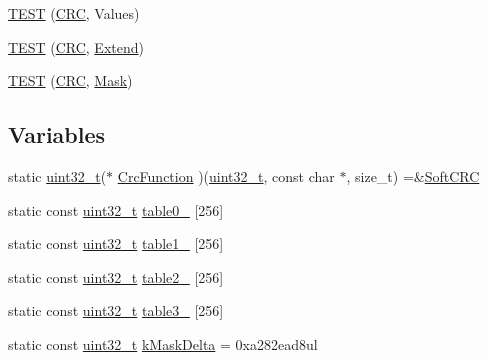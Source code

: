 \begin{DoxyCompactItemize}
\item 
\hyperlink{namespaceleveldb_1_1crc32c_aeca842cf29e5136e1594dd5e0a714d7f}{T\+E\+S\+T} (\hyperlink{classleveldb_1_1crc32c_1_1_c_r_c}{C\+R\+C}, Values)
\item 
\hyperlink{namespaceleveldb_1_1crc32c_aec2f6fd8802f5c6473281a2400301fa4}{T\+E\+S\+T} (\hyperlink{classleveldb_1_1crc32c_1_1_c_r_c}{C\+R\+C}, \hyperlink{namespaceleveldb_1_1crc32c_ac42fd0618afe635356d722fd29f5ff10}{Extend})
\item 
\hyperlink{namespaceleveldb_1_1crc32c_aeae3dd6a190a86fb295e1232715e2b23}{T\+E\+S\+T} (\hyperlink{classleveldb_1_1crc32c_1_1_c_r_c}{C\+R\+C}, \hyperlink{namespaceleveldb_1_1crc32c_a3790e1e939714a29609e46383aafd6cf}{Mask})
\end{DoxyCompactItemize}
\subsection*{Variables}
\begin{DoxyCompactItemize}
\item 
static \hyperlink{stdint_8h_a435d1572bf3f880d55459d9805097f62}{uint32\+\_\+t}($\ast$ \hyperlink{namespaceleveldb_1_1crc32c_a6d47e5e948707883faef34642ea854df}{Crc\+Function} )(\hyperlink{stdint_8h_a435d1572bf3f880d55459d9805097f62}{uint32\+\_\+t}, const char $\ast$, size\+\_\+t) =\&\hyperlink{namespaceleveldb_1_1crc32c_af488f9f0d6bc518b954644a250ae2a6d}{Soft\+C\+R\+C}
\item 
static const \hyperlink{stdint_8h_a435d1572bf3f880d55459d9805097f62}{uint32\+\_\+t} \hyperlink{namespaceleveldb_1_1crc32c_ade0c8f1e2098799a8924d05b30411817}{table0\+\_\+} \mbox{[}256\mbox{]}
\item 
static const \hyperlink{stdint_8h_a435d1572bf3f880d55459d9805097f62}{uint32\+\_\+t} \hyperlink{namespaceleveldb_1_1crc32c_af456bfb794e6108a828e5d3a2a58700c}{table1\+\_\+} \mbox{[}256\mbox{]}
\item 
static const \hyperlink{stdint_8h_a435d1572bf3f880d55459d9805097f62}{uint32\+\_\+t} \hyperlink{namespaceleveldb_1_1crc32c_af5be8e058bd89cbd43972aa986910599}{table2\+\_\+} \mbox{[}256\mbox{]}
\item 
static const \hyperlink{stdint_8h_a435d1572bf3f880d55459d9805097f62}{uint32\+\_\+t} \hyperlink{namespaceleveldb_1_1crc32c_a212c50cb25082d3d84471483d26ac2f5}{table3\+\_\+} \mbox{[}256\mbox{]}
\item 
static const \hyperlink{stdint_8h_a435d1572bf3f880d55459d9805097f62}{uint32\+\_\+t} \hyperlink{namespaceleveldb_1_1crc32c_ae1bd49dbeac3e469a5a4347989f2e8b3}{k\+Mask\+Delta} = 0xa282ead8ul
\end{DoxyCompactItemize}


